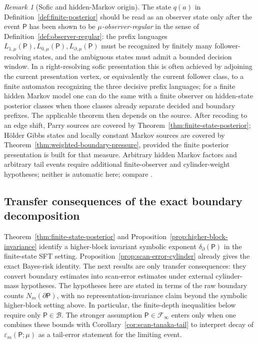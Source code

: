 \documentclass{etds}%
\numberwithin{equation}{section}
\theoremstyle{plain}
\theoremstyle{definition}
\theoremstyle{remark}
\newtheorem{remark}[theorem]{Remark}
\begin{document}
\begin{remark}[Sofic and hidden-Markov origin]
\label{rem:sofic-hidden-markov}
The state $q(a)$ in Definition~\ref{def:finite-posterior} should be read as an
observer state only after the event $\mathsf{P}$ has been shown to be
\emph{$\mu$-observer-regular} in the sense of
Definition~\ref{def:observer-regular}: the prefix languages
$L_{1,\mu}(\mathsf{P}),L_{0,\mu}(\mathsf{P}),L_{\partial,\mu}(\mathsf{P})$ must
be recognized by finitely many follower-resolving states, and the ambiguous
states must admit a bounded decision window.  In a right-resolving sofic
presentation this is often achieved by adjoining the current presentation
vertex, or equivalently the current follower class, to a finite automaton
recognizing the three decisive prefix languages; for a finite hidden Markov
model one can do the same with a finite observer on hidden-state posterior
classes when those classes already separate decided and boundary prefixes.
The applicable theorem then depends on the source.  After recoding to an edge
shift, Parry sources are covered by
Theorem~\ref{thm:finite-state-posterior}; H\"older Gibbs states and locally
constant Markov sources are covered by
Theorem~\ref{thm:weighted-boundary-pressure}, provided the finite posterior
presentation is built for that measure.  Arbitrary hidden Markov factors and
arbitrary tail events require additional finite-observer and cylinder-weight
hypotheses; neither is automatic here; compare
\cite{Blackwell1957,Heller1965,Fischer1975,Krieger1984,Kitchens1998,LindMarcus1995}.
\end{remark}

\subsection{Transfer consequences of the exact boundary decomposition}

Theorem~\ref{thm:finite-state-posterior} and
Proposition~\ref{prop:higher-block-invariance} identify a higher-block
invariant symbolic exponent $\delta_\partial(\mathsf{P})$ in the finite-state
SFT setting.  Proposition~\ref{prop:scan-error-cylinder} already gives the
exact Bayes-risk identity.  The next results are only transfer consequences:
they convert boundary estimates into scan-error estimates under external
cylinder-mass hypotheses.  The
hypotheses here are stated in terms of the raw boundary counts
$N_m(\partial\mathsf{P})$, with no representation-invariance claim beyond the
symbolic higher-block setting above.  In particular, the finite-depth
inequalities below require only $\mathsf{P}\in\mathcal{B}$.  The stronger
assumption $\mathsf{P}\in\mathcal{F}_\infty$ enters only when one combines
these bounds with Corollary~\ref{cor:scan-tanaka-tail} to interpret decay of
$\varepsilon_m(\mathsf{P};\mu)$ as a tail-error statement for the limiting
event.
\end{document}
